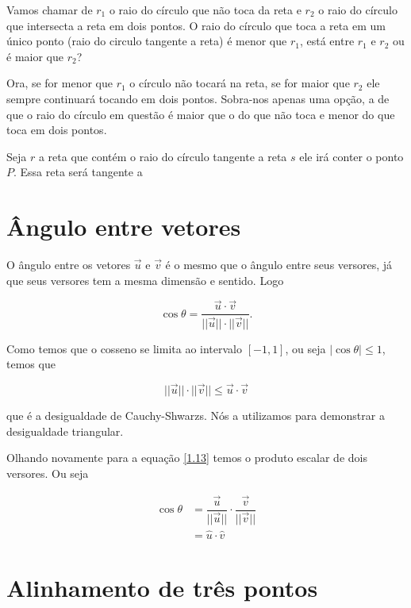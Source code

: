 Vamos chamar de $r_1$ o raio do círculo que não toca da reta e $r_2$ o raio do círculo que intersecta a reta em dois pontos. O raio do círculo que toca a reta em um único ponto (raio do circulo tangente a reta) é menor que $r_1$, está entre $r_1$ e $r_2$ ou é maior que $r_2$?

Ora, se for menor que $r_1$ o círculo não tocará na reta, se for maior que $r_2$ ele sempre continuará tocando em dois pontos. Sobra-nos apenas uma opção, a de que o raio do círculo em questão é maior que o do que não toca e menor do que toca em dois pontos.

Seja $r$ a reta que contém o raio do círculo tangente a reta $s$ ele irá conter o ponto $P$. Essa reta será tangente a 

\section{Ângulo entre vetores}

O ângulo entre os vetores $\vec{u}$ e $\vec{v}$ é o mesmo que o ângulo entre seus versores, já que seus versores tem a mesma dimensão e sentido. Logo

\begin{equation}\label{1.13}
\cos \theta =\dfrac{\vec{u}\cdot \vec{v}}{||\vec{u}||\cdot ||\vec{v}||}.
\end{equation}

Como temos que o cosseno se limita ao intervalo $[-1,1]$, ou seja $|\cos \theta |\leq 1$, temos que

\begin{equation}\label{1.14}
||\vec{u}||\cdot ||\vec{v}||\leq \vec{u}\cdot \vec{v}
\end{equation}

que é a desigualdade de Cauchy-Shwarzs. Nós a utilizamos para demonstrar a desigualdade triangular.

Olhando novamente para a equação \eqref{1.13} temos o produto escalar de dois versores. Ou seja

\begin{equation}\label{1.15}
\begin{split}
\cos \theta&=\dfrac{\vec{u}}{||\vec{u}||}\cdot \dfrac{\vec{v}}{||\vec{v}||}\\
&=\hat{u}\cdot \hat{v}
\end{split}
\end{equation}

\section{Alinhamento de três pontos}
